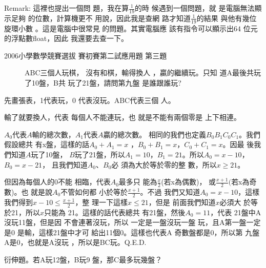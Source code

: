 \documentclass[12pt]{article}
\begin{document}
\bigskip

Remark: 這裡也提出一個問%
題，我在算$\frac{1}{19}$的時%
候遇到一個問題，就%
是電腦無法顯示足夠%
的位數，計算機更不%
用說，因此我是查網%
路才知道$\frac{1}{19}$的結果%
與他有幾位旋環小數%
。這是電腦中很常見%
的問題。其實電腦應%
該有指令可以顯示出$64$%
位元的浮點數float，因此%
我還要去查一下。

\newpage

\begin{description}
\item[2006小學數學競賽選拔%
賽初賽第二試應用題%
第三題] ABC三個人玩棋，%
沒有和棋，輸得換人%
，贏的繼續玩。只知%
道A最後共玩了10盤，B共%
玩了21盤，請問第九盤%
是誰跟誰玩?
\end{description}

\bigskip

先畫張表，1代表玩，0%
代表沒玩。ABC代表三個%
人。

%
\begin{center}

\end{center}%
\bigskip

輸了就要換人，代表%
每個人不能連玩，也%
就是不能有兩個零是%
上下相連。

\bigskip

$A_{0}$代表$A$輸的總次數，$%
A_{1}$代表$A$贏的總次數。%
相同的我們也定義$%
B_{0}B_{1}C_{0}C_{1}$。我們假設總共%
有x盤，這樣的話$A_{0}+A_{1}=x$%
，$B_{0}+B_{1}=x$，$C_{0}+C_{1}=x$。因最%
後我們知道$A$玩了10盤，%
$B$玩了21盤，所以$A_{1}=10$，$%
B_{1}=21$。所以$A_{0}=x-10$，$B_{0}=x-21$，%
且我們知道$A_{0}$、$B_{0}$必%
須為大於等於零的整%
數，所以$x\geq 21$。

\bigskip

但因為每個人的0不能%
相臨，代表$A_{0}$最多只%
能為$\frac{x}{2}$(若x為偶數)，%
或$\frac{x+1}{2}($若x為奇數)。也%
就是說$A_{0}$不管如何都%
小於等於$\frac{x+1}{2}$。不過%
我們又知道$A_{0}=x-10$，這樣%
我們得到$x-10\leq \frac{x+1}{2}$，整%
理一下這樣$x\leq 21， $但是%
前面我們知道$x$必須大%
於等於21，所以$x$只能為%
21。這樣的話代表總共%
有21盤，然後$A_{0}=11$，代表%
21盤中A沒玩11盤，但是因%
不會連著沒玩，所以%
一定是一盤沒玩一盤%
玩，且A第一盤一定是0%
是輸，這樣21盤中才可%
給出11個0。這樣也代表A%
奇數盤都是0，所以第%
九盤A是0，也就是A沒玩%
，所以是BC玩。Q.E.D.

\bigskip

衍伸題。若A玩12盤，B玩9%
盤，那C最多玩幾盤？
\end{document}
